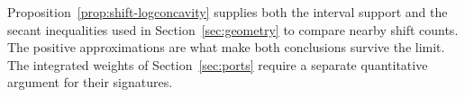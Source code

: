 Proposition~\ref{prop:shift-logconcavity} supplies both the interval
support and the secant inequalities used in Section~\ref{sec:geometry}
to compare nearby shift counts. The positive approximations are what
make both conclusions survive the limit. The integrated weights of
Section~\ref{sec:ports} require a separate quantitative argument for
their signatures.
